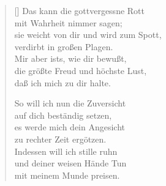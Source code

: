 \begin{multicols}{2}
\begin{verse}[\versewidth]
 Das kann die gottvergessne Rott\\
mit Wahrheit nimmer sagen;\\
sie weicht von dir und wird zum Spott,\\
verdirbt in großen Plagen.\\
Mir aber ists, wie dir bewußt,\\
die größte Freud und höchste Lust,\\
daß ich mich zu dir halte.

 So will ich nun die Zuversicht\\
auf dich beständig setzen,\\
es werde mich dein Angesicht\\
zu rechter Zeit ergötzen.\\
Indessen will ich stille ruhn\\
und deiner weisen Hände Tun\\
mit meinem Munde preisen.

\end{verse}
\end{multicols}
